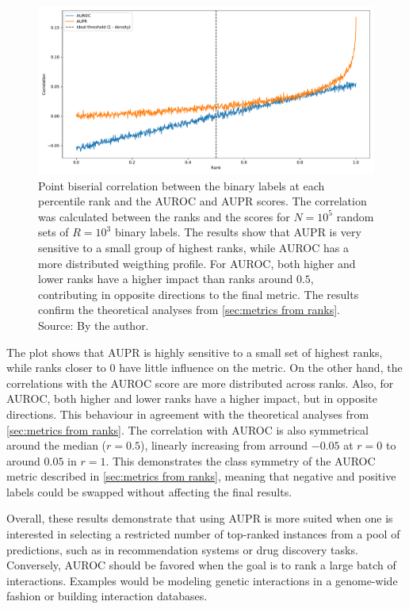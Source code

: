 
\begin{figure}[tb]
    \includegraphics[width=\textwidth]{
        experiments/theoretical_scoring/results/rank_correlation.pdf
    }
    \caption{
        Point biserial correlation between the binary labels at each percentile rank and the AUROC and AUPR scores. The correlation was calculated between the ranks and the scores for $N=10^5$ random sets of $R=10^3$ binary labels. The results show that AUPR is very sensitive to a small group of highest ranks, while AUROC has a more distributed weigthing profile. For AUROC, both higher and lower ranks have a higher impact than ranks around $0.5$, contributing in opposite directions to the final metric. The results confirm the theoretical analyses from \autoref{sec:metrics from ranks}.
        \newline Source: By the author.
    }
    \label{fig:correlation ranks}
\end{figure}

The plot shows that AUPR is highly sensitive to a small set of highest ranks, while ranks closer to $0$ have little influence on the metric. On the other hand, the correlations with the AUROC score are more distributed across ranks. Also, for AUROC, both higher and lower ranks have a higher impact, but in opposite directions.
This behaviour in agreement with the theoretical analyses from \autoref{sec:metrics from ranks}.
The correlation with AUROC is also symmetrical around the median ($r=0.5$), linearly increasing from arround $-0.05$ at $r=0$ to around $0.05$ in $r=1$. This demonstrates the class symmetry of the AUROC metric described in \autoref{sec:metrics from ranks}, meaning that negative and positive labels could be swapped without affecting the final results.

Overall, these results demonstrate that using AUPR is more suited when one is interested in selecting a restricted number of top-ranked instances from a pool of predictions, such as in recommendation systems or drug discovery tasks.
Conversely, AUROC should be favored when the goal is to rank a large batch of interactions. Examples would be modeling genetic interactions in a genome-wide fashion or building interaction databases.

